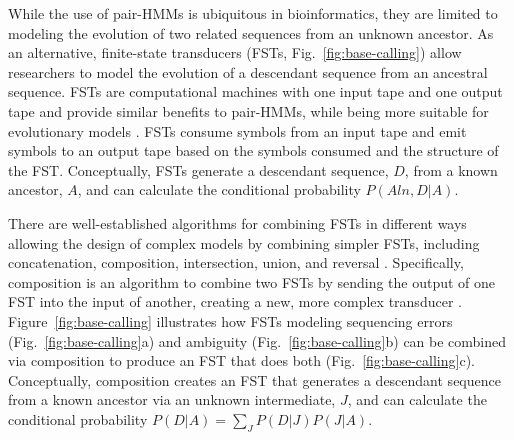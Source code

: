 \documentclass[12pt,letterpaper]{article}
\begin{document}
While the use of pair-HMMs is ubiquitous in bioinformatics, they are limited to modeling the evolution of two related sequences from an unknown ancestor. As an alternative, finite-state transducers (FSTs, Fig.~\ref{fig:base-calling}) allow researchers to model the evolution of a descendant sequence from an ancestral sequence. FSTs are computational machines with one input tape and one output tape and provide similar benefits to pair-HMMs, while being more suitable for evolutionary models \citep{bradley2007transducers}. FSTs consume symbols from an input tape and emit symbols to an output tape based on the symbols consumed and the structure of the FST. Conceptually, FSTs generate a descendant sequence, $D$, from a known ancestor, $A$, and can calculate the conditional probability $P(Aln, D | A)$.

There are well-established algorithms for combining FSTs in different ways allowing the design of complex models by combining simpler FSTs, including concatenation, composition, intersection, union, and reversal \citep{bradley2007transducers,silvestre2021machine}. Specifically, composition is an algorithm to combine two FSTs by sending the output of one FST into the input of another, creating a new, more complex transducer \citep{mohri2005weighted}. Figure~\ref{fig:base-calling} illustrates how FSTs modeling sequencing errors (Fig.~\ref{fig:base-calling}a) and ambiguity (Fig.~\ref{fig:base-calling}b) can be combined via composition to produce an FST that does both (Fig.~\ref{fig:base-calling}c). Conceptually, composition creates an FST that generates a descendant sequence from a known ancestor via an unknown intermediate, $J$, and can calculate the conditional probability $P(D|A) = \sum_{J} P(D|J)P(J|A)$. 
\end{document}
